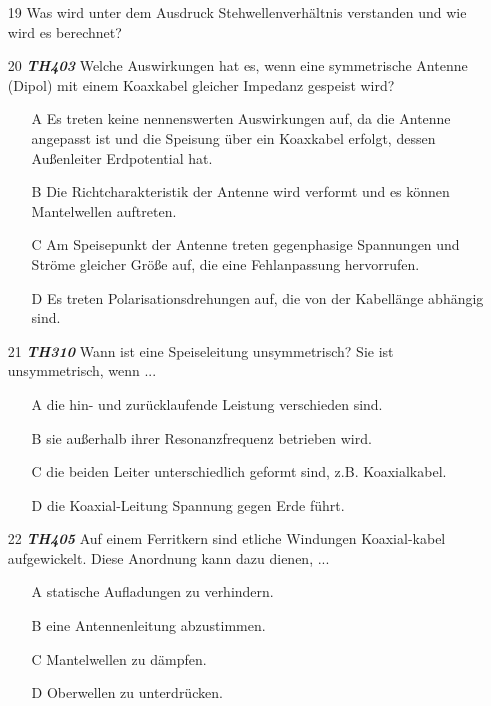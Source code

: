 \begin{enumerate} 
\itemsep1pt\parskip0pt
\item[19] Was wird unter dem Ausdruck Stehwellenverhältnis verstanden und wie wird es berechnet?
\item[20] \emph{\textbf{TH403}}  Welche Auswirkungen hat es, wenn eine symmetrische Antenne (Dipol) mit einem Koaxkabel gleicher Impedanz gespeist wird?
	\begin{enumerate}
	\itemsep1pt\parskip0pt
		\item[A] Es treten keine nennenswerten Auswirkungen auf, da die Antenne angepasst ist und die Speisung über ein Koaxkabel erfolgt, dessen Außenleiter Erdpotential hat.
		\item[B] Die Richtcharakteristik der Antenne wird verformt und es können Mantelwellen auftreten.
		\item[C] Am Speisepunkt der Antenne treten gegenphasige Spannungen und Ströme gleicher Größe auf, die eine Fehlanpassung hervorrufen.
		\item[D] Es treten Polarisationsdrehungen auf, die von der Kabellänge abhängig sind.
	\end{enumerate}
\item[21] \emph{\textbf{TH310}}  Wann ist eine Speiseleitung unsymmetrisch? Sie ist unsymmetrisch, wenn ...
	\begin{enumerate}
	\itemsep1pt\parskip0pt
		\item[A] die hin- und zurücklaufende Leistung verschieden sind.
		\item[B] sie außerhalb ihrer Resonanzfrequenz betrieben wird.
		\item[C] die beiden Leiter unterschiedlich geformt sind, z.B. Koaxialkabel.
		\item[D] die Koaxial-Leitung Spannung gegen Erde führt.
	\end{enumerate}
\item[22] \emph{\textbf{TH405}}  Auf einem Ferritkern sind etliche Windungen Koaxial-kabel aufgewickelt. Diese Anordnung kann dazu dienen, ...
	\begin{enumerate}
	\itemsep1pt\parskip0pt
		\item[A] statische Aufladungen zu verhindern.
		\item[B] eine Antennenleitung abzustimmen.
		\item[C] Mantelwellen zu dämpfen.
		\item[D] Oberwellen zu unterdrücken.
	\end{enumerate}
\end{enumerate}

